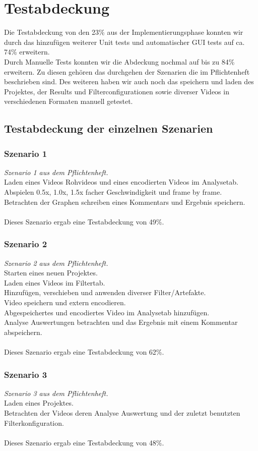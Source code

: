 \documentclass{scrartcl}
\begin{document}
{\section{Testabdeckung}
Die Testabdeckung von den 23\% aus der Implementierungsphase konnten wir durch das hinzufügen weiterer Unit tests und automatischer GUI tests auf ca. 74\% erweitern.\\
Durch Manuelle Tests konnten wir die Abdeckung nochmal auf bis zu 84\% erweitern. Zu diesen gehören das durchgehen der Szenarien die im Pflichtenheft beschrieben sind. Des weiteren haben wir auch noch das speichern und laden des Projektes, der Results und Filterconfigurationen sowie diverser Videos in verschiedenen Formaten manuell getestet.
\subsection{Testabdeckung der einzelnen Szenarien}
\subsubsection{Szenario 1}
\textit{Szenario 1 aus dem Pflichtenheft.}\\
Laden eines Videos Rohvideos und eines encodierten Videos im Analysetab.\\
Abspielen 0.5x, 1.0x, 1.5x facher Geschwindigkeit und frame by frame.\\
Betrachten der Graphen schreiben eines Kommentars und Ergebnis speichern.\\
\\
Dieses Szenario ergab eine Testabdeckung von 49\%.
\subsubsection{Szenario 2}
\textit{Szenario 2 aus dem Pflichtenheft.}\\
Starten eines neuen Projektes.\\
Laden eines Videos im Filtertab.\\
Hinzufügen, verschieben und anwenden diverser Filter/Artefakte.\\
Video speichern und extern encodieren.\\
Abgespeichertes und encodiertes Video im Analysetab hinzufügen.\\
Analyse Auswertungen betrachten und das Ergebnis mit einem Kommentar abspeichern.\\
\\
Dieses Szenario ergab eine Testabdeckung von 62\%.
\subsubsection{Szenario 3}
\textit{Szenario 3 aus dem Pflichtenheft.}\\
Laden eines Projektes.\\
Betrachten der Videos deren Analyse Auswertung und der zuletzt benutzten Filterkonfiguration.\\
\\
Dieses Szenario ergab eine Testabdeckung von 48\%.
}
\end{document}
